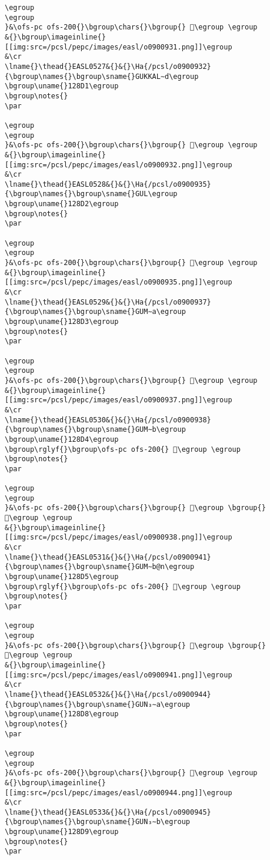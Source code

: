 \begin{verbatim}
\egroup
\egroup
}&\ofs-pc ofs-200{}\bgroup\chars{}\bgroup{} 𒣐\egroup \egroup
&{}\bgroup\imageinline{}[[img:src=/pcsl/pepc/images/easl/o0900931.png]]\egroup
&\cr
\lname{}\thead{}EASL0527&{}&{}\Ha{/pcsl/o0900932}{\bgroup\names{}\bgroup\sname{}GUKKAL∼d\egroup
\bgroup\uname{}128D1\egroup
\bgroup\notes{}
\par 

\egroup
\egroup
}&\ofs-pc ofs-200{}\bgroup\chars{}\bgroup{} 𒣑\egroup \egroup
&{}\bgroup\imageinline{}[[img:src=/pcsl/pepc/images/easl/o0900932.png]]\egroup
&\cr
\lname{}\thead{}EASL0528&{}&{}\Ha{/pcsl/o0900935}{\bgroup\names{}\bgroup\sname{}GUL\egroup
\bgroup\uname{}128D2\egroup
\bgroup\notes{}
\par 

\egroup
\egroup
}&\ofs-pc ofs-200{}\bgroup\chars{}\bgroup{} 𒣒\egroup \egroup
&{}\bgroup\imageinline{}[[img:src=/pcsl/pepc/images/easl/o0900935.png]]\egroup
&\cr
\lname{}\thead{}EASL0529&{}&{}\Ha{/pcsl/o0900937}{\bgroup\names{}\bgroup\sname{}GUM∼a\egroup
\bgroup\uname{}128D3\egroup
\bgroup\notes{}
\par 

\egroup
\egroup
}&\ofs-pc ofs-200{}\bgroup\chars{}\bgroup{} 𒣓\egroup \egroup
&{}\bgroup\imageinline{}[[img:src=/pcsl/pepc/images/easl/o0900937.png]]\egroup
&\cr
\lname{}\thead{}EASL0530&{}&{}\Ha{/pcsl/o0900938}{\bgroup\names{}\bgroup\sname{}GUM∼b\egroup
\bgroup\uname{}128D4\egroup
\bgroup\rglyf{}\bgroup\ofs-pc ofs-200{} 𒣔\egroup \egroup
\bgroup\notes{}
\par 

\egroup
\egroup
}&\ofs-pc ofs-200{}\bgroup\chars{}\bgroup{} 𒣔\egroup \bgroup{} 𒣗\egroup \egroup
&{}\bgroup\imageinline{}[[img:src=/pcsl/pepc/images/easl/o0900938.png]]\egroup
&\cr
\lname{}\thead{}EASL0531&{}&{}\Ha{/pcsl/o0900941}{\bgroup\names{}\bgroup\sname{}GUM∼b@n\egroup
\bgroup\uname{}128D5\egroup
\bgroup\rglyf{}\bgroup\ofs-pc ofs-200{} 𒣕\egroup \egroup
\bgroup\notes{}
\par 

\egroup
\egroup
}&\ofs-pc ofs-200{}\bgroup\chars{}\bgroup{} 𒣕\egroup \bgroup{} 𒣖\egroup \egroup
&{}\bgroup\imageinline{}[[img:src=/pcsl/pepc/images/easl/o0900941.png]]\egroup
&\cr
\lname{}\thead{}EASL0532&{}&{}\Ha{/pcsl/o0900944}{\bgroup\names{}\bgroup\sname{}GUN₃∼a\egroup
\bgroup\uname{}128D8\egroup
\bgroup\notes{}
\par 

\egroup
\egroup
}&\ofs-pc ofs-200{}\bgroup\chars{}\bgroup{} 𒣘\egroup \egroup
&{}\bgroup\imageinline{}[[img:src=/pcsl/pepc/images/easl/o0900944.png]]\egroup
&\cr
\lname{}\thead{}EASL0533&{}&{}\Ha{/pcsl/o0900945}{\bgroup\names{}\bgroup\sname{}GUN₃∼b\egroup
\bgroup\uname{}128D9\egroup
\bgroup\notes{}
\par 


\end{verbatim}

